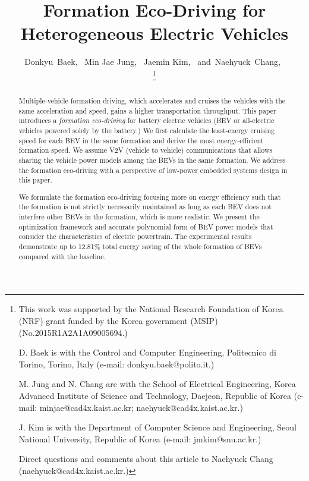 \documentclass{IEEEtran}
\begin{document}
\title{Formation Eco-Driving for Heterogeneous Electric Vehicles}

\author{
Donkyu~Baek,~  
Min Jae Jung,~
Jaemin Kim,~
and~Naehyuck~Chang,~

\thanks{
This work was supported by the National Research Foundation of Korea (NRF) grant funded by the Korea government (MSIP) (No.2015R1A2A1A09005694.) 

D. Baek is with the Control and Computer Engineering, Politecnico di Torino, Torino, Italy (e-mail: donkyu.baek@polito.it.)

M. Jung and N. Chang are with the School of Electrical Engineering, Korea Advanced Institute of Science and Technology, Daejeon, Republic of Korea (e-mail: minjae@cad4x.kaist.ac.kr; naehyuck@cad4x.kaist.ac.kr.)

J. Kim is with the Department of Computer Science and Engineering, Seoul National University, Republic of Korea (e-mail: jmkim@snu.ac.kr.)

Direct questions and comments about this article to Naehyuck Chang (naehyuck@cad4x.kaist.ac.kr.)}
}

\maketitle

\begin{abstract}
Multiple-vehicle formation driving, which accelerates and cruises the vehicles with the same acceleration and speed, gains a higher transportation throughput. This paper introduces a \textit{formation eco-driving} for battery electric vehicles (BEV or all-electric vehicles powered solely by the battery.) We first calculate the least-energy cruising speed for each BEV in the same formation and derive the most energy-efficient formation speed. We assume V2V (vehicle to vehicle) communications that allows sharing the vehicle power models among the BEVs in the same formation. We address the formation eco-driving with a perspective of low-power embedded systems design in this paper.

We formulate the formation eco-driving focusing more on energy efficiency such that the formation is not strictly necessarily maintained as long as each BEV does not interfere other BEVs in the formation, which is more realistic. We present the optimization framework and accurate polynomial form of BEV power models that consider the characteristics of electric powertrain. The experimental results demonstrate up to  12.81\% total energy saving of the whole formation of BEVs compared with the baseline. 
\end{abstract}
\end{document}
